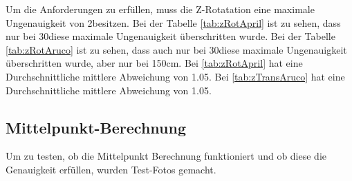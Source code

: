 Um die Anforderungen zu erfüllen, muss die Z-Rotatation eine maximale Ungenauigkeit von 2\degree besitzen.
Bei der Tabelle \ref{tab:zRotApril} ist zu sehen, dass nur bei 30\degree diese maximale Ungenauigkeit überschritten wurde.
Bei der Tabelle \ref{tab:zRotAruco} ist zu sehen, dass auch nur bei 30\degree diese maximale Ungenauigkeit überschritten wurde, aber nur bei 150cm.
Bei \ref{tab:zRotApril} hat eine Durchschnittliche mittlere Abweichung von 1.05\degree. 
Bei \ref{tab:zTransAruco} hat eine Durchschnittliche mittlere Abweichung von 1.05\degree.

\subsection{Mittelpunkt-Berechnung}

Um zu testen, ob die Mittelpunkt Berechnung funktioniert und ob diese die Genauigkeit erfüllen, wurden Test-Fotos gemacht.

